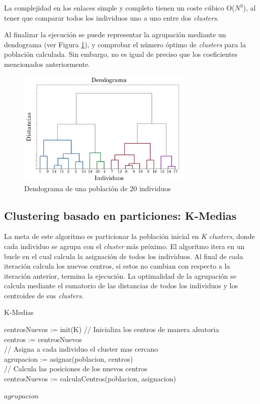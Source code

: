 		La complejidad en los enlaces simple y completo tienen un coste cúbico O(\(N^{3}\)), al tener que comparar todos los individuos uno a uno entre dos \textit{clusters}.
		

		Al finalizar la ejecución se puede representar la agrupación mediante un dendograma \cite{espinoza2012using} (ver Figura \ref{fig:dendograma}), y comprobar el número óptimo de \textit{clusters} para la población calculada. Sin embargo, no es igual de preciso que los coeficientes mencionados anteriormente. 
		
		\begin{figure}[!h]
			\centering
			\includegraphics[width=0.75\textwidth]{images/chapter_2/dendograma}
			\caption{Dendograma de una población de 20 individuos}
			\label{fig:dendograma}
		\end{figure}


	\subsection{Clustering basado en particiones: K-Medias}

		La meta de este algoritmo es particionar la población inicial en \textit{K} \textit{clusters}, donde cada individuo se agrupa con el \textit{cluster} más próximo. El algoritmo itera en un bucle en el cual calcula la asignación de todos los individuos. Al final de cada iteración calcula los nuevos centros, si estos no cambian con respecto a la iteración anterior, termina la ejecución. La optimalidad de la agrupación se calcula mediante el sumatorio de las distancias de todos los individuos y los centroides de sus \textit{clusters}. 
		
		
		\begin{algorithm}[!h]
			\caption{K-Medias}
			centrosNuevos := init(K) // Inicializa los centros de manera aleatoria\\
			
			{
				centros := centrosNuevos\\
				// Asigna a cada individuo el cluster mas cercano\\
				agrupacion := asignar(poblacion, centros)\\
				// Calcula las posiciones de los nuevos centros\\
				centrosNuevos := calculaCentros(poblacion, asignacion)
			}
			
			
			\Return $agrupacion$\;
		\end{algorithm}
		
